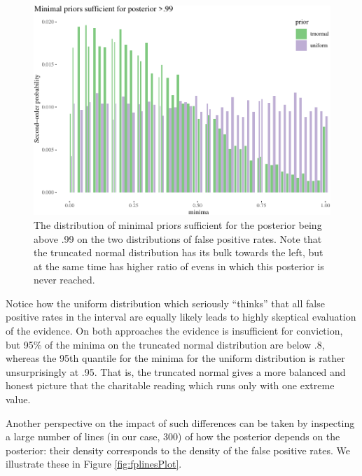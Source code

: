 \documentclass[
  10pt,
  dvipsnames,enabledeprecatedfontcommands]{scrartcl}
\begin{document}
\begin{figure}[H]



\begin{center}\includegraphics[width=0.8\linewidth]{chapter-outline_files/figure-latex/fig:fppMinima-1} \end{center}


\caption{The distribution of minimal priors sufficient for the posterior being above .99 on the two distributions of false positive rates. Note that the truncated normal distribution has its bulk towards the left, but at the same time has higher ratio of evens in which this posterior is never reached. }

\label{fig:fppMinima}

\end{figure}

Notice how the uniform distribution which seriously ``thinks'' that all
false positive rates in the interval are equally likely leads to highly
skeptical evaluation of the evidence. On both approaches the evidence is
insufficient for conviction, but 95\% of the minima on the truncated
normal distribution are below .8, whereas the 95th quantile for the
minima for the uniform distribution is rather unsurprisingly at .95.
That is, the truncated normal gives a more balanced and honest picture
that the charitable reading which runs only with one extreme value.

Another perspective on the impact of such differences can be taken by
inspecting a large number of lines (in our case, 300) of how the
posterior depends on the posterior: their density corresponds to the
density of the false positive rates. We illustrate these in Figure
\ref{fig:fplinesPlot}.
\end{document}
